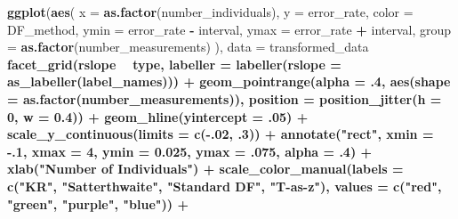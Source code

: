\documentclass[12pt, twoside]{amherstthesis}
\newenvironment{Shaded}{\begin{snugshade}}{\end{snugshade}}
\newcommand{\DataTypeTok}[1]{\textcolor[rgb]{0.13,0.29,0.53}{#1}}
\newcommand{\DecValTok}[1]{\textcolor[rgb]{0.00,0.00,0.81}{#1}}
\newcommand{\FloatTok}[1]{\textcolor[rgb]{0.00,0.00,0.81}{#1}}
\newcommand{\KeywordTok}[1]{\textcolor[rgb]{0.13,0.29,0.53}{\textbf{#1}}}
\newcommand{\NormalTok}[1]{#1}
\newcommand{\OperatorTok}[1]{\textcolor[rgb]{0.81,0.36,0.00}{\textbf{#1}}}
\newcommand{\StringTok}[1]{\textcolor[rgb]{0.31,0.60,0.02}{#1}}
\begin{document}
\begin{Shaded}
\begin{Highlighting}[]
{{{{{{{{{{{\KeywordTok{ggplot}\NormalTok{(}\KeywordTok{aes}\NormalTok{(}
  \DataTypeTok{x =} \KeywordTok{as.factor}\NormalTok{(number_individuals), }\DataTypeTok{y =}\NormalTok{ error_rate, }\DataTypeTok{color =}\NormalTok{ DF_method,}
  \DataTypeTok{ymin =}\NormalTok{ error_rate }\OperatorTok{-}\StringTok{ }\NormalTok{interval, }\DataTypeTok{ymax =}\NormalTok{ error_rate }\OperatorTok{+}\StringTok{ }\NormalTok{interval,}
  \DataTypeTok{group =} \KeywordTok{as.factor}\NormalTok{(number_measurements)}
\NormalTok{), }\DataTypeTok{data =}\NormalTok{ transformed_data }\OperatorTok{%>%}\StringTok{ }\KeywordTok{filter}\NormalTok{(distribution }\OperatorTok{==}\StringTok{ "Lognormal"}\NormalTok{)) }\OperatorTok{+}
\StringTok{  }\KeywordTok{facet_grid}\NormalTok{(rslope }\OperatorTok{~}\StringTok{ }\NormalTok{type,}
             \DataTypeTok{labeller =} \KeywordTok{labeller}\NormalTok{(}\DataTypeTok{rslope =} \KeywordTok{as_labeller}\NormalTok{(label_names))) }\OperatorTok{+}
\StringTok{  }\KeywordTok{geom_pointrange}\NormalTok{(}\DataTypeTok{alpha =} \FloatTok{.4}\NormalTok{, }\KeywordTok{aes}\NormalTok{(}\DataTypeTok{shape =} \KeywordTok{as.factor}\NormalTok{(number_measurements)), }
                  \DataTypeTok{position =} \KeywordTok{position_jitter}\NormalTok{(}\DataTypeTok{h =} \DecValTok{0}\NormalTok{, }\DataTypeTok{w =} \FloatTok{0.4}\NormalTok{)) }\OperatorTok{+}
\StringTok{  }\KeywordTok{geom_hline}\NormalTok{(}\DataTypeTok{yintercept =} \FloatTok{.05}\NormalTok{) }\OperatorTok{+}
\StringTok{  }\KeywordTok{scale_y_continuous}\NormalTok{(}\DataTypeTok{limits =} \KeywordTok{c}\NormalTok{(}\OperatorTok{-}\NormalTok{.}\DecValTok{02}\NormalTok{, }\FloatTok{.3}\NormalTok{)) }\OperatorTok{+}
\StringTok{  }\KeywordTok{annotate}\NormalTok{(}\StringTok{"rect"}\NormalTok{, }\DataTypeTok{xmin =} \FloatTok{-.1}\NormalTok{, }\DataTypeTok{xmax =} \DecValTok{4}\NormalTok{, }\DataTypeTok{ymin =} \FloatTok{0.025}\NormalTok{, }\DataTypeTok{ymax =} \FloatTok{.075}\NormalTok{, }
           \DataTypeTok{alpha =} \FloatTok{.4}\NormalTok{) }\OperatorTok{+}
\StringTok{  }\KeywordTok{xlab}\NormalTok{(}\StringTok{"Number of Individuals"}\NormalTok{) }\OperatorTok{+}
\StringTok{  }\KeywordTok{scale_color_manual}\NormalTok{(}\DataTypeTok{labels =} \KeywordTok{c}\NormalTok{(}\StringTok{"KR"}\NormalTok{, }\StringTok{"Satterthwaite"}\NormalTok{, }
                                \StringTok{"Standard DF"}\NormalTok{, }\StringTok{"T-as-z"}\NormalTok{), }
                     \DataTypeTok{values =} \KeywordTok{c}\NormalTok{(}\StringTok{"red"}\NormalTok{, }\StringTok{"green"}\NormalTok{, }\StringTok{"purple"}\NormalTok{, }\StringTok{"blue"}\NormalTok{)) }\OperatorTok{+}
}}}}}}}}}}}}
\end{Highlighting}
\end{Shaded}
\end{document}
